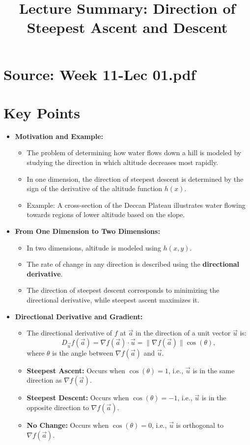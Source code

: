 \documentclass{article}
\title{Lecture Summary: Direction of Steepest Ascent and Descent}
\author{}
\date{}
\begin{document}
\maketitle

\section*{Source: Week 11-Lec 01.pdf}

\section*{Key Points}

\begin{itemize}
  \item \textbf{Motivation and Example:}
    \begin{itemize}
      \item The problem of determining how water flows down a hill is modeled by studying the direction in which altitude decreases most rapidly.
      \item In one dimension, the direction of steepest descent is determined by the sign of the derivative of the altitude function $h(x)$.
      \item Example: A cross-section of the Deccan Plateau illustrates water flowing towards regions of lower altitude based on the slope.
    \end{itemize}

  \item \textbf{From One Dimension to Two Dimensions:}
    \begin{itemize}
      \item In two dimensions, altitude is modeled using $h(x, y)$.
      \item The rate of change in any direction is described using the \textbf{directional derivative}.
      \item The direction of steepest descent corresponds to minimizing the directional derivative, while steepest ascent maximizes it.
    \end{itemize}

  \item \textbf{Directional Derivative and Gradient:}
    \begin{itemize}
      \item The directional derivative of $f$ at $\vec{a}$ in the direction of a unit vector $\vec{u}$ is:
        \[
          D_{\vec{u}} f(\vec{a}) = \nabla f(\vec{a}) \cdot \vec{u} = \|\nabla f(\vec{a})\| \cos(\theta),
        \]
        where $\theta$ is the angle between $\nabla f(\vec{a})$ and $\vec{u}$.
      \item \textbf{Steepest Ascent:} Occurs when $\cos(\theta) = 1$, i.e., $\vec{u}$ is in the same direction as $\nabla f(\vec{a})$.
      \item \textbf{Steepest Descent:} Occurs when $\cos(\theta) = -1$, i.e., $\vec{u}$ is in the opposite direction to $\nabla f(\vec{a})$.
      \item \textbf{No Change:} Occurs when $\cos(\theta) = 0$, i.e., $\vec{u}$ is orthogonal to $\nabla f(\vec{a})$.
    \end{itemize}


\end{itemize}
\end{document}
